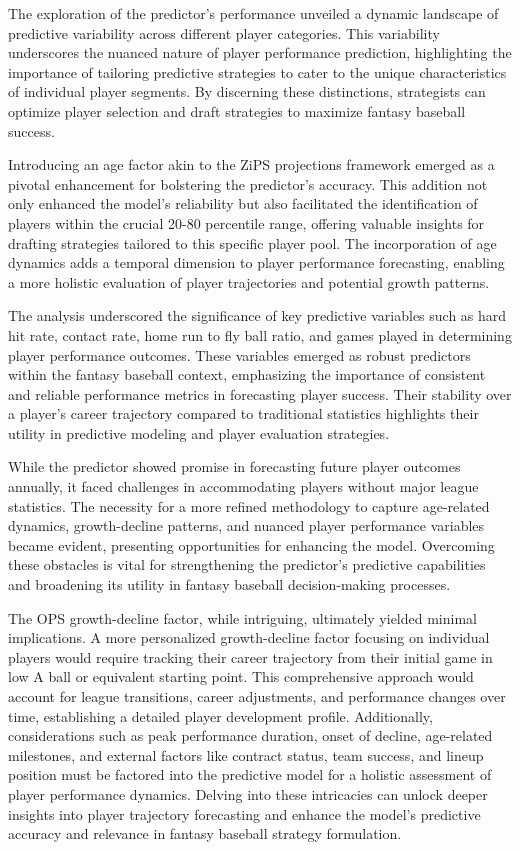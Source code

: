 \documentclass[12pt, english]{article}
\begin{document}
The exploration of the predictor's performance unveiled a dynamic landscape of predictive variability across different player categories. This variability underscores the nuanced nature of player performance prediction, highlighting the importance of tailoring predictive strategies to cater to the unique characteristics of individual player segments. By discerning these distinctions, strategists can optimize player selection and draft strategies to maximize fantasy baseball success.


Introducing an age factor akin to the ZiPS projections framework emerged as a pivotal enhancement for bolstering the predictor's accuracy. This addition not only enhanced the model's reliability but also facilitated the identification of players within the crucial 20-80 percentile range, offering valuable insights for drafting strategies tailored to this specific player pool. The incorporation of age dynamics adds a temporal dimension to player performance forecasting, enabling a more holistic evaluation of player trajectories and potential growth patterns.


The analysis underscored the significance of key predictive variables such as hard hit rate, contact rate, home run to fly ball ratio, and games played in determining player performance outcomes. These variables emerged as robust predictors within the fantasy baseball context, emphasizing the importance of consistent and reliable performance metrics in forecasting player success. Their stability over a player's career trajectory compared to traditional statistics highlights their utility in predictive modeling and player evaluation strategies.

While the predictor showed promise in forecasting future player outcomes annually, it faced challenges in accommodating players without major league statistics. The necessity for a more refined methodology to capture age-related dynamics, growth-decline patterns, and nuanced player performance variables became evident, presenting opportunities for enhancing the model. Overcoming these obstacles is vital for strengthening the predictor's predictive capabilities and broadening its utility in fantasy baseball decision-making processes.

The OPS growth-decline factor, while intriguing, ultimately yielded minimal implications. A more personalized growth-decline factor focusing on individual players would require tracking their career trajectory from their initial game in low A ball or equivalent starting point. This comprehensive approach would account for league transitions, career adjustments, and performance changes over time, establishing a detailed player development profile. Additionally, considerations such as peak performance duration, onset of decline, age-related milestones, and external factors like contract status, team success, and lineup position must be factored into the predictive model for a holistic assessment of player performance dynamics. Delving into these intricacies can unlock deeper insights into player trajectory forecasting and enhance the model's predictive accuracy and relevance in fantasy baseball strategy formulation.
\end{document}
